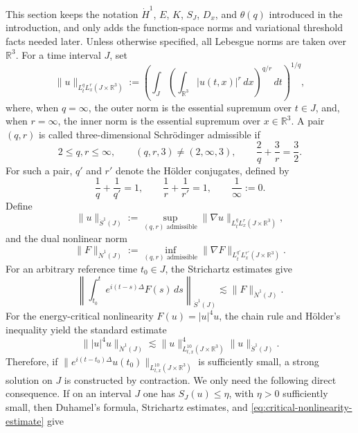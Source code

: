 \documentclass[10pt,a4paper]{amsart}
\numberwithin{equation}{section}
\newcommand{\R}{\mathbb R}
\newcommand{\Nd}{\dot N^1}
\newcommand{\Sd}{\dot S^1}
\begin{document}
This section keeps the notation $\dot H^1$, $E$, $K$, $S_J$, $D_x$, and $\theta(q)$ introduced in the introduction, and only adds the function-space norms and variational threshold facts needed later. Unless otherwise specified, all Lebesgue norms are taken over $\R^3$. For a time interval $J$, set
\begin{equation*}
  \|u\|_{L_t^qL_x^r(J\times\R^3)}
  :=\left(\int_J\left(\int_{\R^3}|u(t,x)|^r\,dx\right)^{q/r}\,dt\right)^{1/q},
\end{equation*}
where, when $q=\infty$, the outer norm is the essential supremum over $t\in J$, and, when $r=\infty$, the inner norm is the essential supremum over $x\in\R^3$. A pair $(q,r)$ is called three-dimensional Schr\"odinger admissible if
\begin{equation*}
  2\le q,r\le\infty,
  \qquad (q,r,3)\ne(2,\infty,3),
  \qquad \frac2q+\frac3r=\frac32.
\end{equation*}
For such a pair, $q'$ and $r'$ denote the H\"older conjugates, defined by
\begin{equation*}
  \frac1q+\frac1{q'}=1,
  \qquad
  \frac1r+\frac1{r'}=1,
  \qquad \frac1\infty:=0.
\end{equation*}
Define
\begin{equation*}
  \|u\|_{\Sd(J)}:=\sup_{(q,r)\text{ admissible}}\|\nabla u\|_{L_t^qL_x^r(J\times\R^3)},
\end{equation*}
and the dual nonlinear norm
\begin{equation*}
  \|F\|_{\Nd(J)}
  :=\inf_{(q,r)\text{ admissible}}\|\nabla F\|_{L_t^{q'}L_x^{r'}(J\times\R^3)}.
\end{equation*}
For an arbitrary reference time $t_0\in J$, the Strichartz estimates give
\begin{equation*}
  \left\|\int_{t_0}^{t}e^{i(t-s)\Delta}F(s)\,ds\right\|_{\Sd(J)}
  \lesssim \|F\|_{\Nd(J)}.
\end{equation*}
For the energy-critical nonlinearity $F(u)=|u|^4u$, the chain rule and H\"older's inequality yield the standard estimate
\begin{equation}\label{eq:critical-nonlinearity-estimate}
  \||u|^4u\|_{\Nd(J)}
  \lesssim \|u\|_{L_{t,x}^{10}(J\times\R^3)}^4\|u\|_{\Sd(J)}.
\end{equation}
Therefore, if $\|e^{i(t-t_0)\Delta}u(t_0)\|_{L_{t,x}^{10}(J\times\R^3)}$ is sufficiently small, a strong solution on $J$ is constructed by contraction. We only need the following direct consequence. If on an interval $J$ one has $S_J(u)\le\eta$, with $\eta>0$ sufficiently small, then Duhamel's formula, Strichartz estimates, and \eqref{eq:critical-nonlinearity-estimate} give
\end{document}
